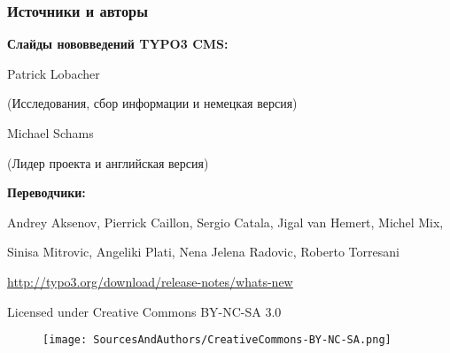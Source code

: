 \begin{frame}[fragile]
	\frametitle{Источники и авторы}

	\vspace{-0.6cm}

	\centerline{\textbf{Слайды нововведений TYPO3 CMS:}}

	\begin{center}
		\smaller
			\centerline{Patrick Lobacher}
			\centerline{(Исследования, сбор информации и немецкая версия)}
			\vspace{0.1cm}
			\centerline{Michael Schams}
			\centerline{(Лидер проекта и английская версия)}
		\normalsize
	\end{center}
	\vspace{-0.6cm}
	\begin{center}
		\smaller
			\centerline{\textbf{Переводчики:}}
			\centerline{Andrey Aksenov, Pierrick Caillon, Sergio Catala, Jigal van Hemert, Michel Mix,}
			\centerline{Sinisa Mitrovic, Angeliki Plati, Nena Jelena Radovic, Roberto Torresani}
		\normalsize
	\end{center}
	\vspace{-0.6cm}
	\smaller\begin{center}\url{http://typo3.org/download/release-notes/whats-new}\end{center}\normalsize

	\smaller\begin{center}Licensed under Creative Commons BY-NC-SA 3.0\end{center}\normalsize
	\begin{figure}\vspace*{-0.3cm}
		\texttt{[image: SourcesAndAuthors/CreativeCommons-BY-NC-SA.png]}
	\end{figure}

\end{frame}

